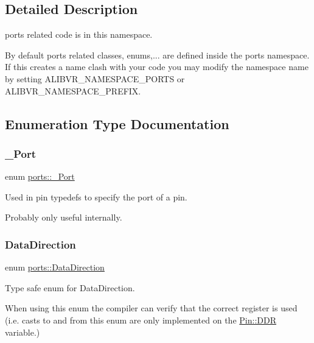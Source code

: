 \subsection{Detailed Description}
ports related code is in this namespace. 

By default ports related classes, enums,... are defined inside the {\ttfamily ports} namespace. If this creates a name clash with your code you may modify the namespace name by setting A\+L\+I\+B\+V\+R\+\_\+\+N\+A\+M\+E\+S\+P\+A\+C\+E\+\_\+\+P\+O\+R\+TS or A\+L\+I\+B\+V\+R\+\_\+\+N\+A\+M\+E\+S\+P\+A\+C\+E\+\_\+\+P\+R\+E\+F\+IX. 

\subsection{Enumeration Type Documentation}
\hypertarget{namespaceports_a9949317f344930bd6ad1097e80c97b67}{}\label{namespaceports_a9949317f344930bd6ad1097e80c97b67} 
\subsubsection{\texorpdfstring{\+\_\+\+Port}{\_Port}}
{\footnotesize\ttfamily enum \hyperlink{namespaceports_a9949317f344930bd6ad1097e80c97b67}{ports\+::\+\_\+\+Port}\hspace{0.3cm}{\ttfamily [strong]}}



Used in pin {\ttfamily typedef}s to specify the port of a pin. 

Probably only useful internally. \hypertarget{namespaceports_a46987e78fa447129742fadda5eccafb4}{}\label{namespaceports_a46987e78fa447129742fadda5eccafb4} 
\subsubsection{\texorpdfstring{Data\+Direction}{DataDirection}}
{\footnotesize\ttfamily enum \hyperlink{namespaceports_a46987e78fa447129742fadda5eccafb4}{ports\+::\+Data\+Direction}\hspace{0.3cm}{\ttfamily [strong]}}



Type safe enum for Data\+Direction. 

When using this enum the compiler can verify that the correct register is used (i.\+e. casts to and from this enum are only implemented on the \hyperlink{structports_1_1Pin_aaebb4d6cb5db0635fe8e7d6e7d315c7f}{Pin\+::\+D\+DR} variable.)

